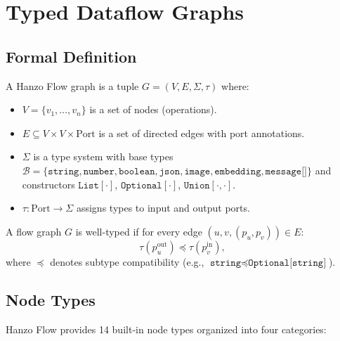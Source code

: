\section{Typed Dataflow Graphs}

\label{sec:formalism}

\subsection{Formal Definition}

\begin{definition}
A Hanzo Flow graph is a tuple $G = (V, E, \Sigma, \tau)$ where:
\begin{itemize}[leftmargin=1.1em]
    \item $V = \{v_1, \ldots, v_n\}$ is a set of nodes (operations).
    \item $E \subseteq V \times V \times \text{Port}$ is a set of directed edges with port annotations.
    \item $\Sigma$ is a type system with base types $\mathcal{B} = \{\texttt{string}, \texttt{number}, \texttt{boolean}, \texttt{json}, \texttt{image}, \texttt{embedding}, \texttt{message[]}\}$ and constructors $\texttt{List}[\cdot]$, $\texttt{Optional}[\cdot]$, $\texttt{Union}[\cdot, \cdot]$.
    \item $\tau : \text{Port} \to \Sigma$ assigns types to input and output ports.
\end{itemize}
\end{definition}

\begin{definition}
A flow graph $G$ is well-typed if for every edge $(u, v, (p_u, p_v)) \in E$:
\begin{equation}
\tau(p_u^{\text{out}}) \preceq \tau(p_v^{\text{in}}),
\end{equation}
where $\preceq$ denotes subtype compatibility (e.g., $\texttt{string} \preceq \texttt{Optional[string]}$).
\end{definition}

\subsection{Node Types}

Hanzo Flow provides 14 built-in node types organized into four categories:

